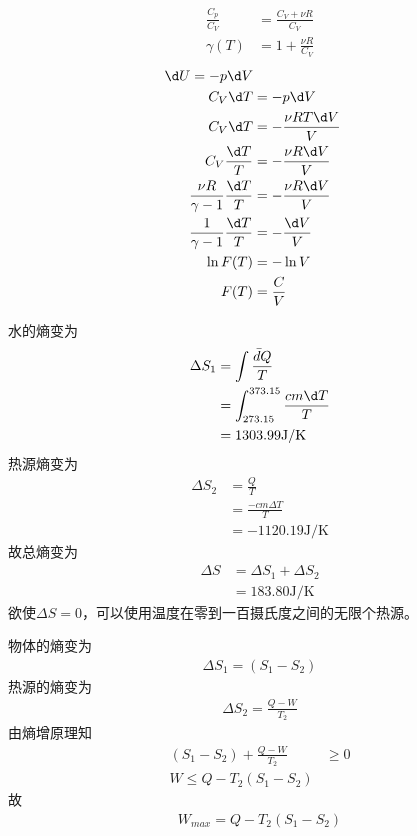 \documentclass{phyasgn}
\begin{document}
\begin{sol}[4]
    \begin{align*}
        \frac{C_p}{C_V}&=\frac{C_V+\nu R}{C_V}\\
        \gamma(T)&=1+\frac{\nu R}{C_V}
    \end{align*}
    \begin{align*}
        \d U=-p\d V\\
        C_V\d T&=-p\d V\\
        C_V\d T&=-\frac{\nu R T\d V}{V}\\
        C_V\frac{\d T}{T}&=-\frac{\nu R\d V}{V}\\
        \frac{\nu R}{\gamma-1}\frac{\d T}{T}&=-\frac{\nu R\d V}{V}\\
        \frac{1}{\gamma-1}\frac{\d T}{T}&=-\frac{\d V}{V}\\
        \ln F(T)&=-\ln V\\
        F(T)&=\frac{C}{V}
    \end{align*}
\end{sol}\par

\begin{sol}[5]
    水的熵变为
    \begin{align*}
        \Delta S_1&=\int\frac{\bar{d}Q}{T}\\
        &=\int_{273.15}^{373.15}\frac{cm\d T}{T}\\
        &=1303.99\text{J/K}
    \end{align*}
    热源熵变为
    \begin{align*}
        \Delta S_2&=\frac{Q}{T}\\
        &=\frac{-cm\Delta T}{T}\\
        &=-1120.19\text{J/K}
    \end{align*}
    故总熵变为
    \begin{align*}
        \Delta S&=\Delta S_1+\Delta S_2\\
        &=183.80\text{J/K}
    \end{align*}
    欲使$\Delta S=0$，可以使用温度在零到一百摄氏度之间的无限个热源。
\end{sol}\par

\begin{sol}[6]
    物体的熵变为
    \begin{align*}
        \Delta S_1=(S_1-S_2)
    \end{align*}
    热源的熵变为
    \begin{align*}
        \Delta S_2=\frac{Q-W}{T_2}
    \end{align*}
    由熵增原理知
    \begin{align*}
        (S_1-S_2)+\frac{Q-W}{T_2}&\geq 0\\
        W\leq Q-T_2(S_1-S_2)
    \end{align*}
    故
    \begin{align*}
        W_{max}=Q-T_2(S_1-S_2)
    \end{align*}
\end{sol}\par
\end{document}
